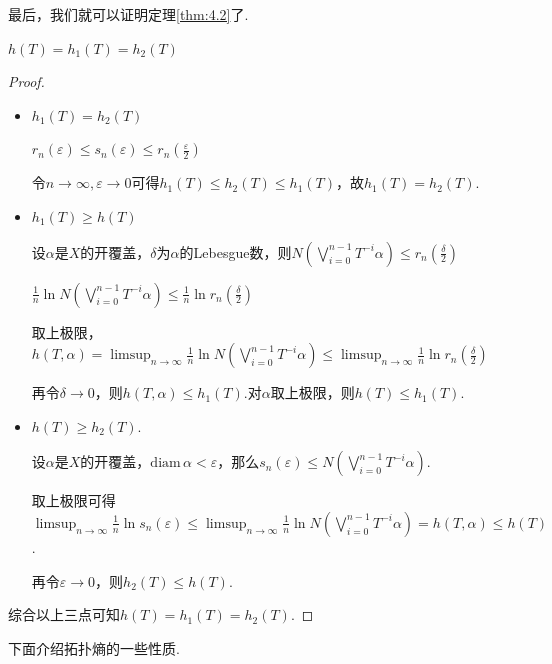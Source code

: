 最后，我们就可以证明定理\ref{thm:4.2}了.
\begin{theorem*}
    $h(T)=h_1(T)=h_2(T)$
\end{theorem*}
\begin{proof}
    \begin{itemize}
        \item $h_1(T)=h_2(T)$\par
        $r_n(\varepsilon)\leq s_n(\varepsilon)\leq r_n\left(\frac{\varepsilon}{2}\right)$\par
        令$n\to\infty,\varepsilon\to 0$可得$h_1(T)\leq h_2(T)\leq h_1(T)$，故$h_1(T)=h_2(T)$.\par
        \item $h_1(T)\geq h(T)$\par
        设$\alpha$是$X$的开覆盖，$\delta$为$\alpha$的Lebesgue数，则$N\left(\bigvee_{i=0}^{n-1}T^{-i}\alpha\right)\leq r_n\left(\frac{\delta}{2}\right)$\par
        $\frac{1}{n}\ln{N\left(\bigvee_{i=0}^{n-1}T^{-i}\alpha\right)}\leq \frac{1}{n}\ln{r_n\left(\frac{\delta}{2}\right)}$\par
        取上极限，$h(T,\alpha)=\limsup_{n\to\infty}\frac{1}{n}\ln{N\left(\bigvee_{i=0}^{n-1}T^{-i}\alpha\right)}\leq \limsup_{n\to\infty}\frac{1}{n}\ln{r_n\left(\frac{\delta}{2}\right)}$\par
        再令$\delta\to 0$，则$h(T,\alpha)\leq h_1(T)$.对$\alpha$取上极限，则$h(T)\leq h_1(T)$.
        \item $h(T)\geq h_2(T)$.\par
        设$\alpha$是$X$的开覆盖，$\mathrm{diam}\,\alpha<\varepsilon$，那么$s_n(\varepsilon)\leq N\left(\bigvee_{i=0}^{n-1}T^{-i}\alpha\right)$.\par
        取上极限可得$\limsup_{n\to\infty}{\frac{1}{n}\ln{s_n(\varepsilon)}}\leq \limsup_{n\to\infty}{\frac{1}{n}\ln{N\left(\bigvee_{i=0}^{n-1}T^{-i}\alpha\right)}}=h(T,\alpha)\leq h(T)$.\par
        再令$\varepsilon\to 0$，则$h_2(T)\leq h(T)$.
    \end{itemize}\par
    综合以上三点可知$h(T)=h_1(T)=h_2(T)$.
\end{proof}

下面介绍拓扑熵的一些性质.\par

